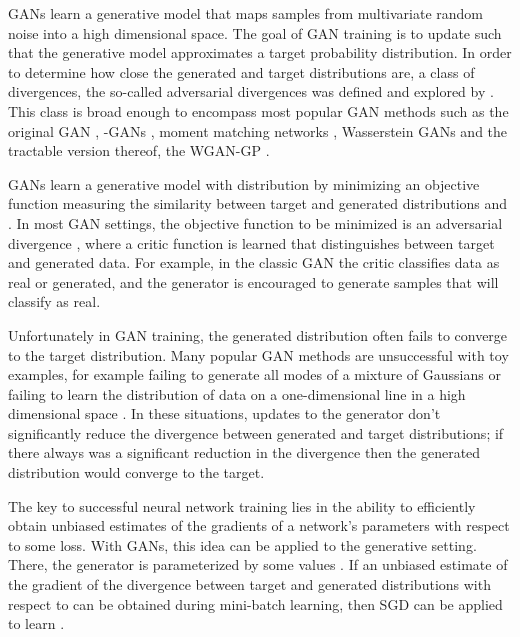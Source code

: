 \documentclass{article}
\begin{document}
 GANs learn a generative model  that maps samples from multivariate random noise into a high dimensional space.
 The goal of GAN training is to update  such that the generative model approximates a target probability distribution.
 In order to determine how close the generated and target distributions are, a class of divergences, the so-called adversarial
 divergences was defined and explored by \cite{liu2017approximation}. This class is broad enough to encompass most popular GAN methods
 such as the original GAN \cite{goodfellow2014generative}, -GANs \cite{nowozin2016f}, moment matching networks \cite{li2015generative},
 Wasserstein GANs \cite{arjovsky2017wasserstein} and the tractable version thereof, the WGAN-GP \cite{gulrajani2017improved}.

 GANs learn a generative model with distribution  by minimizing an objective function
  measuring the similarity between target and generated distributions  and .
 In most GAN settings, the objective function to be minimized is an adversarial divergence \cite{liu2017approximation}, where a critic function is learned
 that distinguishes between target and generated data.
 For example, in the classic GAN \cite{goodfellow2014generative}
 the critic  classifies data as real or generated, and the generator  is encouraged
 to generate samples that  will classify as real.

 Unfortunately in GAN training, the generated distribution often fails to converge to the target distribution.
 Many popular GAN methods are unsuccessful with toy examples, for example failing to generate all modes of a
 mixture of Gaussians \cite{srivastava2017veegan,metz2016unrolled}
 or failing to learn the distribution of data on a one-dimensional line in a high dimensional space \cite{fedus2017many}.
 In these situations, updates to the generator don't significantly reduce the divergence between generated and target distributions;
 if there always was a significant reduction in the divergence then the generated distribution would converge to the target.

 The key to successful neural network training lies in the ability to efficiently obtain unbiased estimates of the gradients of a network's
 parameters with respect to some loss.
 With GANs, this idea can be applied to the generative setting. There, the generator  is parameterized by some
 values . If an unbiased estimate of the gradient of the divergence between target and generated distributions
 with respect to  can be obtained during mini-batch learning, then SGD can be applied to learn .
\end{document}
